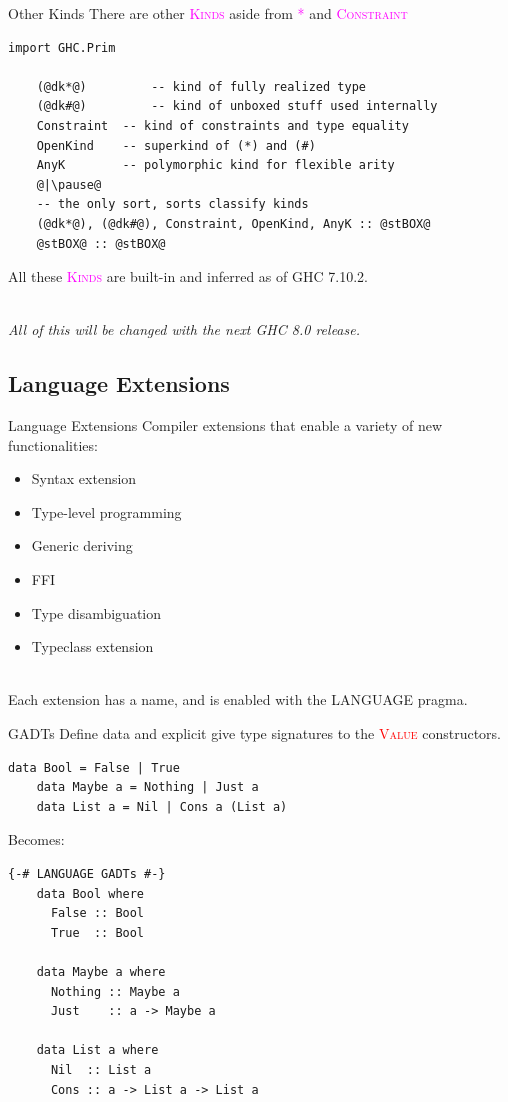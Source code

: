 \documentclass[xcolor={usenames,dvipsnames}]{beamer}
\newcommand{\hvalcon}[1]{\textcolor{Red}{\textsc{#1}}}
\newcommand{\hkind}[1]{\textcolor{Fuchsia}{\textsc{#1}}}
\begin{document}
\begin{frame}[fragile]{Other Kinds}
  There are other \hkind{Kinds} aside from \hkind{*} and \hkind{Constraint}
  \begin{lstlisting}[style=hask]
    import GHC.Prim
    
    (@dk*@)         -- kind of fully realized type
    (@dk#@)         -- kind of unboxed stuff used internally
    Constraint  -- kind of constraints and type equality
    OpenKind    -- superkind of (*) and (#)
    AnyK        -- polymorphic kind for flexible arity
    @|\pause@
    -- the only sort, sorts classify kinds
    (@dk*@), (@dk#@), Constraint, OpenKind, AnyK :: @stBOX@
    @stBOX@ :: @stBOX@
  \end{lstlisting}

  All these \hkind{Kinds} are built-in and inferred as of GHC 7.10.2.
  
  \ \\
  \textit{\tiny{All of this will be changed with the next GHC 8.0 release.}}
\end{frame}


\subsection{Language Extensions}

\begin{frame}[fragile]{Language Extensions}
  Compiler extensions that enable a variety of new functionalities:
  \begin{itemize}
    \item Syntax extension
    \item Type-level programming
    \item Generic deriving
    \item FFI
    \item Type disambiguation
    \item Typeclass extension
  \end{itemize}

  \ \\
  Each extension has a name, and is enabled with the LANGUAGE pragma.
\end{frame}

\begin{frame}[fragile]{GADTs}
  Define data and explicit give type signatures to the \hvalcon{Value} constructors.
  \begin{lstlisting}[style=hask]
    data Bool = False | True
    data Maybe a = Nothing | Just a
    data List a = Nil | Cons a (List a)
  \end{lstlisting}

  Becomes:
  \begin{lstlisting}[style=hask]
    {-# LANGUAGE GADTs #-}
    data Bool where
      False :: Bool
      True  :: Bool

    data Maybe a where
      Nothing :: Maybe a
      Just    :: a -> Maybe a

    data List a where
      Nil  :: List a
      Cons :: a -> List a -> List a
  \end{lstlisting}
\end{frame}
\end{document}
